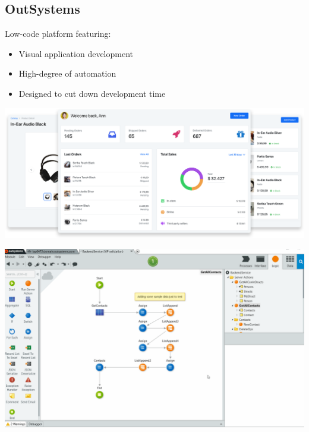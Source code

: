 \documentclass[notes=hide]{beamer}
\begin{document}
\subsection{OutSystems} %
\begin{frame}{\secname}{\subsecname}
  Low-code platform featuring:
  \begin{itemize}
  \item Visual application development
  \item High-degree of automation
  \item Designed to cut down development time
  \end{itemize}
\end{frame}
\begin{frame}{\secname}{\subsecname}
  \includegraphics[width=1.0\textwidth]{assets/outsystems-app.png}
\end{frame}
\begin{frame}{\secname}{\subsecname}
  \includegraphics[width=1.0\textwidth]{assets/outsystems-studio.png}
\end{frame}
\end{document}
